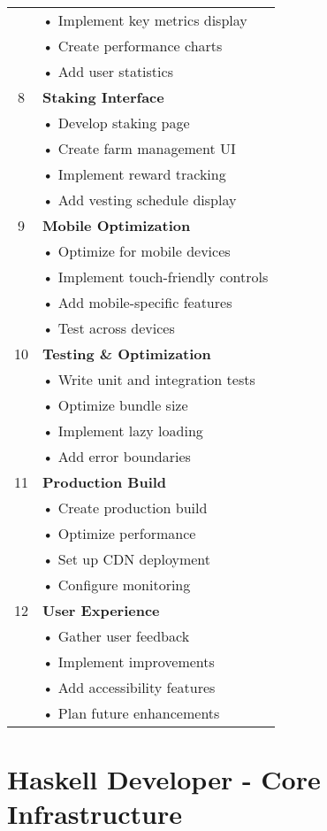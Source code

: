 \documentclass{article}
\begin{document}
\begin{longtable}{|c|p{}|}
& • Implement key metrics display\\
& • Create performance charts\\
& • Add user statistics\\
\hline
8 & \textbf{Staking Interface}\\
& • Develop staking page\\
& • Create farm management UI\\
& • Implement reward tracking\\
& • Add vesting schedule display\\
\hline
9 & \textbf{Mobile Optimization}\\
& • Optimize for mobile devices\\
& • Implement touch-friendly controls\\
& • Add mobile-specific features\\
& • Test across devices\\
\hline
10 & \textbf{Testing \& Optimization}\\
& • Write unit and integration tests\\
& • Optimize bundle size\\
& • Implement lazy loading\\
& • Add error boundaries\\
\hline
11 & \textbf{Production Build}\\
& • Create production build\\
& • Optimize performance\\
& • Set up CDN deployment\\
& • Configure monitoring\\
\hline
12 & \textbf{User Experience}\\
& • Gather user feedback\\
& • Implement improvements\\
& • Add accessibility features\\
& • Plan future enhancements\\
\hline
\end{longtable}

\section*{Haskell Developer - Core Infrastructure}
\end{document}
